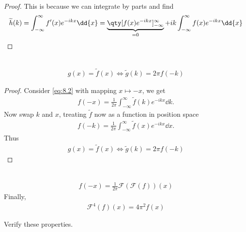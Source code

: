 \begin{proof}
	This is because we can integrate by parts and find
	\begin{align*}
		\widetilde h(k) = \int_{-\infty}^\infty f'(x) e^{-ikx} \dd{x} = \underbrace{\qty[f(x) e^{-ikx}]_{-\infty}^\infty}_{=0} + ik\int_{-\infty}^\infty f(x) e^{-ikx} \dd{x}
	\end{align*}
\end{proof}

\begin{proposition} ~\vspace*{-1.5\baselineskip}
	\begin{align} \label{eq:8.14}
		g(x) = \widetilde{f}(x) \iff \widetilde{g}(k) = 2 \pi f(-k)
	\end{align}
\end{proposition}

\begin{proof}
	Consider \cref{eq:8.2} with mapping $x \mapsto -x$, we get
	\begin{align*}
		f(-x) = \frac{1}{2\pi} \int_{-\infty}^\infty \widetilde f(k) e^{-ikx} \dd{k}.
	\end{align*}
	Now swap $k$ and $x$, treating $\widetilde f$ now as a function in position space
	\begin{align*}
		f(-k) = \frac{1}{2\pi} \int_{-\infty}^\infty \widetilde f(x) e^{-ikx} \dd{x}.
	\end{align*}
	Thus
	\begin{align*}
		g(x) = \widetilde f(x) \iff \widetilde g(k) = 2\pi f(-k)
	\end{align*}
\end{proof}

\begin{corollary} ~\vspace*{-1.5\baselineskip}
	\begin{align*}
		f(-x) = \frac{1}{2\pi} \mathcal F(\mathcal F(f))(x)
	\end{align*}
	Finally,
	\begin{align*}
		\mathcal F^4(f)(x) = 4\pi^2 f(x)
	\end{align*}
\end{corollary}

\begin{exercise}
	Verify these properties.
\end{exercise}

